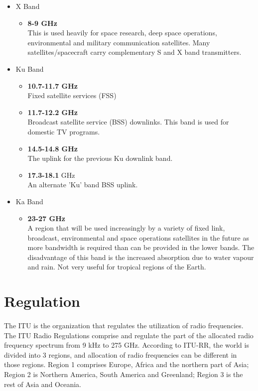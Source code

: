 \documentclass[12pt,a4paper]{report}
\begin{document}
\begin{itemize}
\item X Band
	\begin{itemize}
	\item \textbf{8-9 GHz}\\
	This is used heavily for space research, deep space operations, environmental and military communication satellites. Many satellites/spacecraft carry complementary S and X band transmitters.
	\end{itemize}
\item Ku Band
	\begin{itemize}
	\item \textbf{10.7-11.7 GHz}\\
	Fixed satellite services (FSS)
	\item \textbf{11.7-12.2 GHz}\\
	Broadcast satellite service (BSS) downlinks. This band is used for domestic TV programs.
	\item \textbf{14.5-14.8 GHz}\\
	The uplink for the previous Ku downlink band.
	\item \textbf{17.3-18.1} GHz\\
	An alternate 'Ku' band BSS uplink.
	\end{itemize}
\item Ka Band
	\begin{itemize}
	\item \textbf{23-27 GHz}\\
	A region that will be used increasingly by a variety of fixed link, broadcast, environmental and space operations satellites in the future as more bandwidth is required than can be provided in the lower bands. The disadvantage of this band is the increased absorption due to water vapour and rain. Not very useful for tropical regions of the Earth.
	\end{itemize}
\end{itemize}

\section{Regulation}
\paragraph{}The ITU is the organization that regulates the utilization of radio frequencies.  The ITU Radio Regulations comprise and regulate the part of the allocated radio frequency spectrum from 9 kHz to 275 GHz. According to ITU-RR, the world is divided into 3 regions, and allocation of radio frequencies can be different in those regions. Region 1 comprises Europe, Africa and the northern part of Asia; Region 2 is Northern America, South America and Greenland; Region 3 is the rest of Asia and Oceania.
\end{document}
